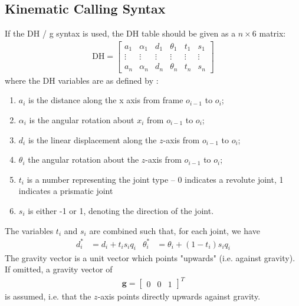\documentclass[12pt]{article}
\begin{document}
\subsection{Kinematic Calling Syntax}
If the DH / g syntax is used, the DH table should be given as a $n\times 6$ matrix:
\begin{align}
	\text{DH} = \begin{bmatrix}
		a_1 & \alpha_1 & d_1 & \theta_1 & t_1 & s_1\\
		\vdots &\vdots &\vdots &\vdots &\vdots &\vdots\\
		a_n & \alpha_n & d_n & \theta_n & t_n & s_n
	\end{bmatrix}
\end{align}
where the DH variables are as defined by \cite{spong2008}:
\begin{enumerate}[itemsep=0pt]
	\item $a_i$ is the distance along the x axis from frame $o_{i-1}$ to $o_i$;
	\item $\alpha_i$ is the angular rotation about $x_i$ from $o_{i-1}$ to $o_i$;
	\item $d_i$ is the linear displacement along the $z$-axis from $o_{i-1}$ to $o_i$;
	\item $\theta_i$ the angular rotation about the $z$-axis from $o_{i-1}$ to $o_i$;
	\item $t_i$ is a number representing the joint type -- 0 indicates a revolute joint, 1 indicates a prismatic joint
	\item $s_i$ is either -1 or 1, denoting the direction of the joint.
\end{enumerate}
The variables $t_i$ and $s_i$ are combined such that, for each joint, we have
\begin{align}
	d_i^* &= d_i + t_i s_i q_i &
	\theta_i^* &= \theta_i + (1-t_i)s_i q_i
\end{align}
The gravity vector is a unit vector which points "upwards" (i.e. against gravity). If omitted, a gravity vector of
\begin{align}
	\mathbf{g} = \begin{bmatrix} 0 & 0 & 1\end{bmatrix}^T
\end{align}
is assumed, i.e. that the $z$-axis points directly upwards against gravity.
\end{document}
